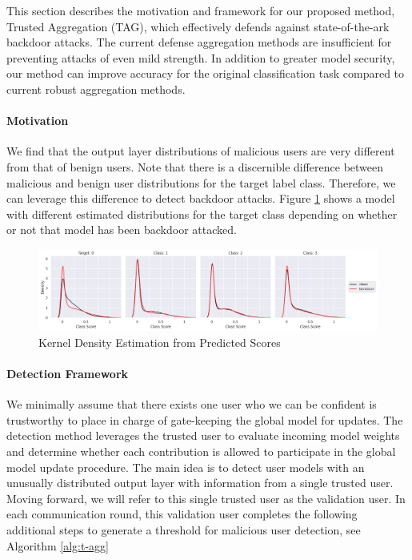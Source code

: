\documentclass{article} %
\begin{document}
This section describes the motivation and framework for our proposed method, Trusted Aggregation (TAG), which effectively defends against state-of-the-ark backdoor attacks. The current defense aggregation methods are insufficient for preventing attacks of even mild strength. In addition to greater model security, our method can improve accuracy for the original classification task compared to current robust aggregation methods.

\paragraph{Motivation}

We find that the output layer distributions of malicious users are very different from that of benign users. Note that there is a discernible difference between malicious and benign user distributions for the target label class. Therefore, we can leverage this difference to detect backdoor attacks. Figure \ref{fig: motivation} shows a model with different estimated distributions for the target class depending on whether or not that model has been backdoor attacked. 

\begin{figure}[H]
    \centering
    \includegraphics[width=\textwidth]{make_article/make_visuals/visuals/ext_motivation.png}
    \caption{Kernel Density Estimation from Predicted Scores}
    \label{fig: motivation}
\end{figure}

\paragraph{Detection Framework}

We minimally assume that there exists one user who we can be confident is trustworthy to place in charge of gate-keeping the global model for updates. The detection method leverages the trusted user to evaluate incoming model weights and determine whether each contribution is allowed to participate in the global model update procedure. The main idea is to detect user models with an unusually distributed output layer with information from a single trusted user. Moving forward, we will refer to this single trusted user as the validation user. In each communication round, this validation user completes the following additional steps to generate a threshold for malicious user detection, see Algorithm \ref{alg:t-agg}
\end{document}
